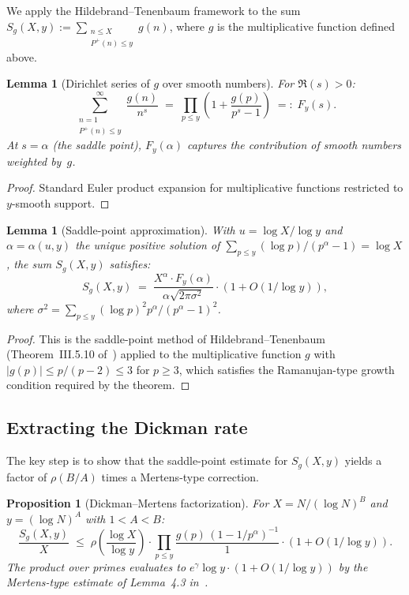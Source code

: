 \documentclass[11pt,reqno]{amsart}
\theoremstyle{plain}
\newtheorem{lemma}[theorem]{Lemma}
\newtheorem{proposition}[theorem]{Proposition}
\theoremstyle{definition}
\theoremstyle{remark}
\newcommand{\Pplus}{P^{+}}
\begin{document}
We apply the Hildebrand--Tenenbaum framework to the sum
$S_g(X,y) := \sum_{\substack{n \le X \\ \Pplus(n) \le y}} g(n)$,
where $g$ is the multiplicative function defined above.

\begin{lemma}[Dirichlet series of $g$ over smooth numbers]
\label{lem:dirichlet}
For $\Re(s) > 0$:
\[
  \sum_{\substack{n=1 \\ \Pplus(n) \le y}}^{\infty}
  \frac{g(n)}{n^s}
  \;=\; \prod_{p \le y}
  \left(1 + \frac{g(p)}{p^s - 1}\right)
  \;=:\; F_y(s).
\]
At $s = \alpha$ (the saddle point), $F_y(\alpha)$ captures the
contribution of smooth numbers weighted by~$g$.
\end{lemma}

\begin{proof}
Standard Euler product expansion for multiplicative functions
restricted to $y$-smooth support.
\end{proof}

\begin{lemma}[Saddle-point approximation]\label{lem:saddle}
With $u = \log X / \log y$ and $\alpha = \alpha(u,y)$ the unique
positive solution of $\sum_{p \le y} (\log p)/(p^{\alpha} - 1) = \log X$,
the sum $S_g(X,y)$ satisfies:
\[
  S_g(X,y) \;=\;
  \frac{X^{\alpha} \cdot F_y(\alpha)}
  {\alpha \sqrt{2\pi \sigma^2}}
  \cdot (1 + O(1/\log y)),
\]
where $\sigma^2 = \sum_{p \le y} (\log p)^2 p^{\alpha}/(p^{\alpha}-1)^2$.
\end{lemma}

\begin{proof}
This is the saddle-point method of Hildebrand--Tenenbaum
(Theorem~III.5.10 of~\cite{Tenenbaum2015}) applied to the
multiplicative function $g$ with
$|g(p)| \le p/(p-2) \le 3$ for $p \ge 3$, which satisfies the
Ramanujan-type growth condition required by the theorem.
\end{proof}

\subsection{Extracting the Dickman rate}

The key step is to show that the saddle-point estimate for $S_g(X,y)$
yields a factor of $\rho(B/A)$ times a Mertens-type correction.

\begin{proposition}[Dickman--Mertens factorization]\label{prop:DM}
For $X = N/(\log N)^B$ and $y = (\log N)^A$ with $1 < A < B$:
\[
  \frac{S_g(X,y)}{X}
  \;\le\;
  \rho\!\left(\frac{\log X}{\log y}\right)
  \cdot \prod_{p \le y} \frac{g(p)\,(1-1/p^{\alpha})^{-1}}{1}
  \cdot (1 + O(1/\log y)).
\]
The product over primes evaluates to $e^{\gamma}\log y\cdot(1+O(1/\log y))$
by the Mertens-type estimate of Lemma~4.3 in~\cite{MT1}.
\end{proposition}
\end{document}
